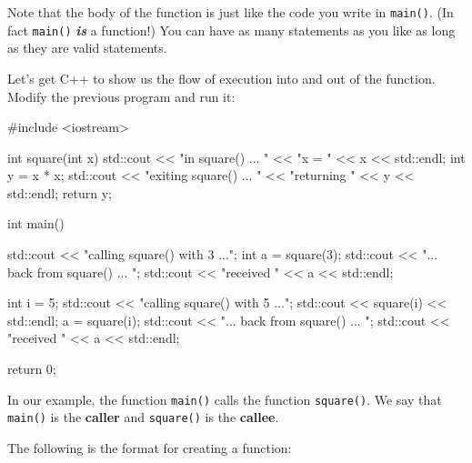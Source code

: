 Note that the body of the function is just like the code you write in \texttt{main()}. (In fact \texttt{main()} \textbf{\textit{is}} a function!) You can have as many statements as you like as long as they are valid statements.

Let's get C++ to show us the flow of execution into and out of the function. Modify the previous program and run it:

\begin{consolethree}[escapeinside=||]
#include <iostream>

int square(int x)
{
    std::cout << "in square() ... "
              << "x = " << x << std::endl;
    int y = x * x;
    std::cout << "exiting square() ... "
              << "returning " << y << std::endl;
    return y;
}

int main()
{
    std::cout << "calling square() with 3 ...";
    int a = square(3);
    std::cout << "... back from square() ... ";
    std::cout << "received " << a << std::endl;

    int i = 5;
    std::cout << "calling square() with 5 ...";
    std::cout << square(i) << std::endl;
    a = square(i);
    std::cout << "... back from square() ... ";
    std::cout << "received " << a << std::endl;

    return 0;
}
\end{consolethree}

In our example, the function \texttt{main()} calls the function \texttt{square()}. We say that \texttt{main()} is the \textbf{caller} and \texttt{square()} is the \textbf{callee}.

The following is the format for creating a function:










